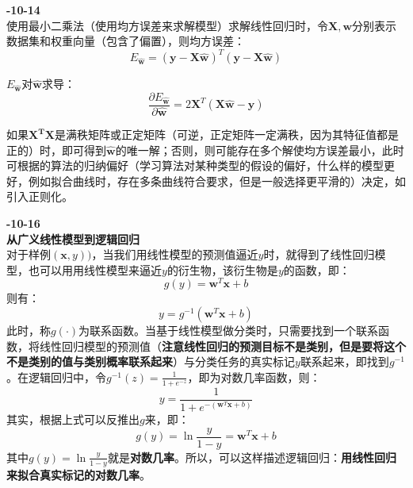 \textbf{-10-14}\\
使用最小二乘法（使用均方误差来求解模型）求解线性回归时，令$\boldsymbol{X}, \boldsymbol{w}$分别表示数据集和权重向量（包含了偏置），则均方误差：
$$
E_{\boldsymbol{\hat w}} = (\boldsymbol{y} - \boldsymbol{X} \boldsymbol{\hat w})^T (\boldsymbol{y} - \boldsymbol{X} \boldsymbol{\hat w})
$$

$E_{\boldsymbol{\hat w}}$对$\boldsymbol{\hat w}$求导：
$$
\frac{\partial E_{\boldsymbol{\hat w}}}{\partial \boldsymbol{\hat w}} = 2 \boldsymbol{X}^T(\boldsymbol{X}\boldsymbol{\hat w} - \boldsymbol{y})
$$

如果$\boldsymbol{X^T X}$是满秩矩阵或正定矩阵（可逆，正定矩阵一定满秩，因为其特征值都是正的）时，即可得到$\boldsymbol{\hat w}$的唯一解；否则，则可能存在多个解使均方误差最小，此时可根据的算法的归纳偏好（学习算法对某种类型的假设的偏好，什么样的模型更好，例如拟合曲线时，存在多条曲线符合要求，但是一般选择更平滑的）决定，如引入正则化。

\textbf{-10-16}\\
\textbf{从广义线性模型到逻辑回归} \\
对于样例$(\boldsymbol{x}, y))$，当我们用线性模型的预测值逼近$y$时，就得到了线性回归模型，也可以用用线性模型来逼近$y$的衍生物，该衍生物是$y$的函数，即：
$$
g(y) = \boldsymbol{w}^T \boldsymbol{x} + b
$$
则有：
$$
y = g^{-1}(\boldsymbol{w}^T \boldsymbol{x} + b)
$$
此时，称$g(\cdot)$为联系函数。当基于线性模型做分类时，只需要找到一个联系函数，将线性回归模型的预测值（\textbf{注意线性回归的预测目标不是类别，但是要将这个不是类别的值与类别概率联系起来}）与分类任务的真实标记$y$联系起来，即找到$g^{-1}$。在逻辑回归中，令$g^{-1}(z) = \frac{1}{1 + e ^{-z}}$，即为对数几率函数，则：
$$
y = \frac{1}{1 + e^{-(\boldsymbol{w}^T \boldsymbol{x} + b)}}
$$
其实，根据上式可以反推出$g$来，即：
$$
g(y) = \ln \frac{y}{1 - y} = \boldsymbol{w}^T \boldsymbol{x} + b
$$
其中$g(y) = \ln \frac{y}{1 - y}$就是\textbf{对数几率}。所以，可以这样描述逻辑回归：\textbf{用线性回归来拟合真实标记的对数几率}。

